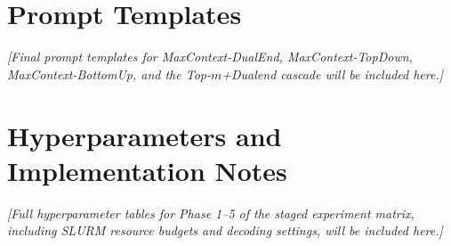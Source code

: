 \section{Prompt Templates}
\label{sec:prompts}

\textit{[Final prompt templates for MaxContext-DualEnd, MaxContext-TopDown,
MaxContext-BottomUp, and the Top-$m$+Dualend cascade will be included here.]}

\section{Hyperparameters and Implementation Notes}
\label{sec:hparams}

\textit{[Full hyperparameter tables for Phase 1--5 of the staged experiment
matrix, including SLURM resource budgets and decoding settings, will be
included here.]}
